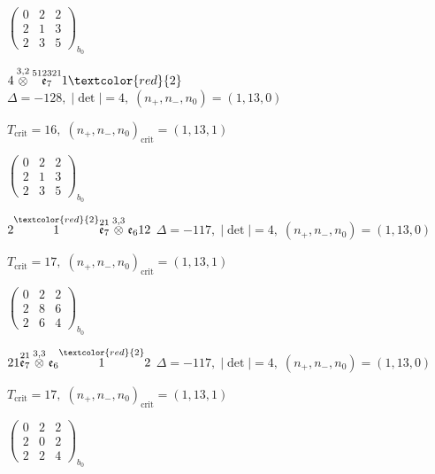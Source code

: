\documentclass[10pt]{article}
\begin{document}
\hspace{2em}$\left(\begin{smallmatrix}0 & 2 & 2 \\ 2 & 1 & 3 \\ 2 & 3 & 5\end{smallmatrix}\right)_{\!b_0}$

\smallskip

$4\overset{3,2}{\otimes}\overset{512321}{\mathfrak{e}_7}1\textcolor{red}{2}$ \quad $\Delta=-128,\; |\det|=4,\; (n_+,n_-,n_0)=(1,13,0)$

\hspace{1em}$T_{\text{crit}}=16,\; (n_+,n_-,n_0)_{\text{crit}}=(1,13,1)$

\hspace{2em}$\left(\begin{smallmatrix}0 & 2 & 2 \\ 2 & 1 & 3 \\ 2 & 3 & 5\end{smallmatrix}\right)_{\!b_0}$

\smallskip

$2\overset{\textcolor{red}{2}}{1}\overset{21}{\mathfrak{e}_7}\overset{3,3}{\otimes}\mathfrak{e}_612$ \quad $\Delta=-117,\; |\det|=4,\; (n_+,n_-,n_0)=(1,13,0)$

\hspace{1em}$T_{\text{crit}}=17,\; (n_+,n_-,n_0)_{\text{crit}}=(1,13,1)$

\hspace{2em}$\left(\begin{smallmatrix}0 & 2 & 2 \\ 2 & 8 & 6 \\ 2 & 6 & 4\end{smallmatrix}\right)_{\!b_0}$

$21\overset{21}{\mathfrak{e}_7}\overset{3,3}{\otimes}\mathfrak{e}_6\overset{\textcolor{red}{2}}{1}2$ \quad $\Delta=-117,\; |\det|=4,\; (n_+,n_-,n_0)=(1,13,0)$

\hspace{1em}$T_{\text{crit}}=17,\; (n_+,n_-,n_0)_{\text{crit}}=(1,13,1)$

\hspace{2em}$\left(\begin{smallmatrix}0 & 2 & 2 \\ 2 & 0 & 2 \\ 2 & 2 & 4\end{smallmatrix}\right)_{\!b_0}$
\end{document}
